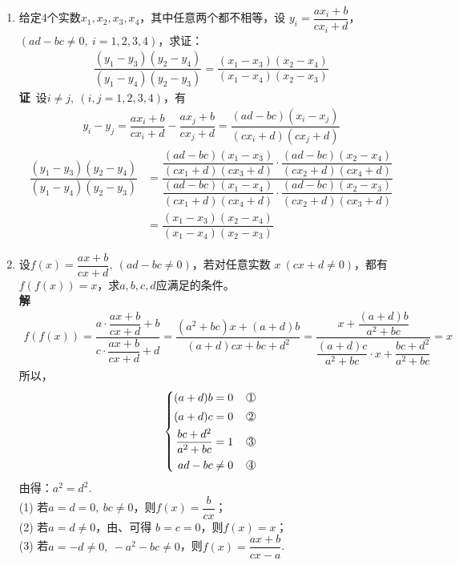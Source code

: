 \begin{enumerate}[label={【\textbf{例\thechapter.\arabic*}】},
 leftmargin=\inteval{\myenumleftmargin}pt,
 itemsep=\inteval{\myenumitempsep}pt,
 itemindent=\inteval{\myenumitemindent}pt]
\item \label{分式线性变换保交比例题}
给定4个实数$ x_1,x_2,x_3,x_4 $，其中任意两个都不相等，设
$ y_i=\dfrac{ax_i+b}{cx_i+d} $，$ (ad-bc\neq 0,\ i=1,2,3,4) $，求证：
\begin{gather}\label{分式线性变换保交比}
    \dfrac{(y_1-y_3)(y_2-y_4)}{(y_1-y_4)(y_2-y_3)}=
    \dfrac{(x_1-x_3)(x_2-x_4)}{(x_1-x_4)(x_2-x_3)}
\end{gather}
\textbf{证}\ 设$ i\neq j,\ (i,j=1,2,3,4) $，有
\begin{gather*}
    y_i-y_j=\dfrac{ax_i+b}{cx_i+d}-\dfrac{ax_j+b}{cx_j+d}=
    \dfrac{(ad-bc)(x_i-x_j)}{(cx_i+d)(cx_j+d)}
\end{gather*}
\begin{align*}
    \dfrac{(y_1-y_3)(y_2-y_4)}{(y_1-y_4)(y_2-y_3)} &=
    \dfrac{\dfrac{(ad-bc)(x_1-x_3)}{(cx_1+d)(cx_3+d)}\cdot
        \dfrac{(ad-bc)(x_2-x_4)}{(cx_2+d)(cx_4+d)}}{
        \dfrac{(ad-bc)(x_1-x_4)}{(cx_1+d)(cx_4+d)}\cdot
        \dfrac{(ad-bc)(x_2-x_3)}{(cx_2+d)(cx_3+d)} } \\
    &=\dfrac{(x_1-x_3)(x_2-x_4)}{(x_1-x_4)(x_2-x_3)}
\end{align*}

\item 设$ f(x)=\dfrac{ax+b}{cx+d},\ (ad-bc\neq 0) $，若对任意实数
$ x\ (cx+d\neq 0) $，都有$ f(f(x))=x $，求$ a,b,c,d $应满足的条件。\\
\textbf{解}\ 
\begin{gather*}
    f(f(x))=\dfrac{a\cdot\dfrac{ax+b}{cx+d}+b}{c\cdot
        \dfrac{ax+b}{cx+d}+d}=
    \dfrac{(a^2+bc)x+(a+d)b}{(a+d)cx+bc+d^2}=
    \dfrac{x+\dfrac{(a+d)b}{a^2+bc}}{\dfrac{(a+d)c}{a^2+bc}
        \cdot x+ \dfrac{bc+d^2}{a^2+bc}}=x
\end{gather*}
所以，
\begin{align*}
    \left\{
    \begin{aligned}
        (a+d)b=0\q  & \mycircled{1} \\
        (a+d)c=0\q  & \mycircled{2} \\
        \dfrac{bc+d^2}{a^2+bc}=1\q  & \mycircled{3} \\
        ad-bc\neq 0\q  & \mycircled{4}
    \end{aligned}
    \right.
\end{align*}
由得：$ a^2=d^2 $. \\
(1) 若$ a=d=0,\ bc\neq 0 $，则$ f(x)=\dfrac{b}{cx} $；\\
(2) 若$ a=d\neq 0 $，由、可得
$ b=c=0 $，则$ f(x)=x $；\\
(3) 若$ a=-d\neq 0,\ -a^2-bc\neq 0 $，则$ f(x)=\dfrac{ax+b}{cx-a} $.


\end{enumerate}
